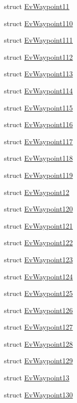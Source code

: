 \begin{DoxyCompactItemize}
struct \hyperlink{structsmacc_1_1EvWaypoint11}{Ev\+Waypoint11}
\item 
struct \hyperlink{structsmacc_1_1EvWaypoint110}{Ev\+Waypoint110}
\item 
struct \hyperlink{structsmacc_1_1EvWaypoint111}{Ev\+Waypoint111}
\item 
struct \hyperlink{structsmacc_1_1EvWaypoint112}{Ev\+Waypoint112}
\item 
struct \hyperlink{structsmacc_1_1EvWaypoint113}{Ev\+Waypoint113}
\item 
struct \hyperlink{structsmacc_1_1EvWaypoint114}{Ev\+Waypoint114}
\item 
struct \hyperlink{structsmacc_1_1EvWaypoint115}{Ev\+Waypoint115}
\item 
struct \hyperlink{structsmacc_1_1EvWaypoint116}{Ev\+Waypoint116}
\item 
struct \hyperlink{structsmacc_1_1EvWaypoint117}{Ev\+Waypoint117}
\item 
struct \hyperlink{structsmacc_1_1EvWaypoint118}{Ev\+Waypoint118}
\item 
struct \hyperlink{structsmacc_1_1EvWaypoint119}{Ev\+Waypoint119}
\item 
struct \hyperlink{structsmacc_1_1EvWaypoint12}{Ev\+Waypoint12}
\item 
struct \hyperlink{structsmacc_1_1EvWaypoint120}{Ev\+Waypoint120}
\item 
struct \hyperlink{structsmacc_1_1EvWaypoint121}{Ev\+Waypoint121}
\item 
struct \hyperlink{structsmacc_1_1EvWaypoint122}{Ev\+Waypoint122}
\item 
struct \hyperlink{structsmacc_1_1EvWaypoint123}{Ev\+Waypoint123}
\item 
struct \hyperlink{structsmacc_1_1EvWaypoint124}{Ev\+Waypoint124}
\item 
struct \hyperlink{structsmacc_1_1EvWaypoint125}{Ev\+Waypoint125}
\item 
struct \hyperlink{structsmacc_1_1EvWaypoint126}{Ev\+Waypoint126}
\item 
struct \hyperlink{structsmacc_1_1EvWaypoint127}{Ev\+Waypoint127}
\item 
struct \hyperlink{structsmacc_1_1EvWaypoint128}{Ev\+Waypoint128}
\item 
struct \hyperlink{structsmacc_1_1EvWaypoint129}{Ev\+Waypoint129}
\item 
struct \hyperlink{structsmacc_1_1EvWaypoint13}{Ev\+Waypoint13}
\item 
struct \hyperlink{structsmacc_1_1EvWaypoint130}{Ev\+Waypoint130}

\end{DoxyCompactItemize}
